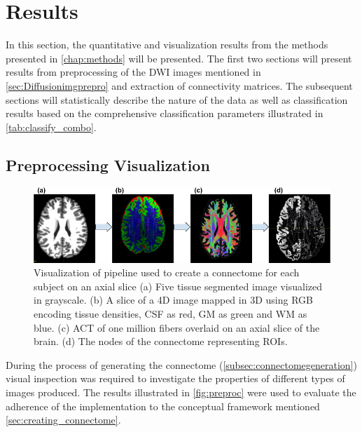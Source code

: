 \documentclass[msthesis.tex]{subfiles}
\begin{document}
\chapter{Results}
In this section, the quantitative and visualization results from the methods presented in \autoref{chap:methods} will be presented. The first two sections will present results from preprocessing of the \gls{DWI} images mentioned in \autoref{sec:Diffusionimgprepro} and extraction of connectivity matrices. The subsequent sections will statistically describe the nature of the data as well as classification results based on the comprehensive classification parameters illustrated in \autoref{tab:classify_combo}.

\section{Preprocessing Visualization}
\begin{figure}
    \centering
    \includegraphics[width=\textwidth]{images/Preprocessing_pipeline.png}
    \caption{Visualization of pipeline used to create a connectome for each subject on an axial slice (a) Five tissue segmented image visualized in grayscale. (b) A slice of a 4D image mapped in 3D using RGB encoding tissue densities, CSF as red, GM as green and WM as blue. (c) \gls{ACT} of one million fibers overlaid on an axial slice of the brain. (d) The nodes of the connectome representing ROIs.}
    \label{fig:preproc}
\end{figure}

During the process of generating the connectome (\autoref{subsec:connectomegeneration}) visual inspection was required to investigate the properties of different types of images produced. The results illustrated in \autoref{fig:preproc} were used to evaluate the adherence of the implementation to the conceptual framework mentioned \autoref{sec:creating_connectome}. 
\end{document}
